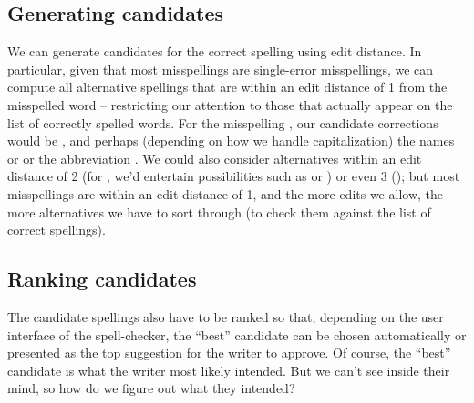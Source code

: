 \subsection{Generating candidates}
\label{sec:generating-candidates}


We can generate candidates for the correct spelling using edit distance.  In particular, given that most misspellings are single-error misspellings, we can compute all alternative spellings that are within an edit distance of 1 from the misspelled word -- restricting our attention to those that actually appear on the list of correctly spelled words.  For the misspelling , our candidate corrections would be ,  and perhaps (depending on how we handle capitalization) the names  or  or the abbreviation .  We could also consider alternatives within an edit distance of 2 (for , we'd entertain possibilities such as  or ) or even 3 (); but most misspellings are within an edit distance of 1, and the more edits we allow, the more alternatives we have to sort through (to check them against the list of correct spellings).


\subsection{Ranking candidates}
\label{sec:ranking-candidates}

The candidate spellings also have to be ranked so that, depending on the user interface of the spell-checker, the ``best'' candidate can be chosen automatically or presented as the top suggestion for the writer to approve.  Of course, the ``best'' candidate is what the writer most likely intended.  But we can't see inside their mind, so how do we figure out what they intended?


